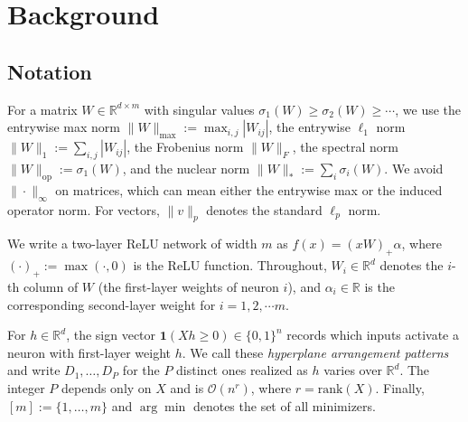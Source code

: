 \documentclass{article}
\begin{document}

\section{Background}
\label{sec:background} 

\subsection{Notation}
\label{sec:notation}
For a matrix $W \in \mathbb{R}^{d \times m}$ with singular values $\sigma_1(W) \geq \sigma_2(W) \geq \cdots$, we use the entrywise max norm $\|W\|_{\max} := \max_{i,j} |W_{ij}|$, the entrywise $\ell_1$ norm $\|W\|_1 := \sum_{i,j} |W_{ij}|$, the Frobenius norm $\|W\|_F$, the spectral norm $\|W\|_{\mathrm{op}} := \sigma_1(W)$, and the nuclear norm $\|W\|_* := \sum_i \sigma_i(W)$. We avoid $\|\cdot\|_\infty$ on matrices, which can mean either the entrywise max or the induced operator norm. For vectors, $\|v\|_p$ denotes the standard $\ell_p$ norm. 

We write a two-layer ReLU network of width $m$ as $f(x) = (xW)_+ \alpha$, where $(\cdot)_+ := \max(\cdot, 0)$ is the ReLU function. Throughout, $W_i \in \mathbb{R}^d$ denotes the $i$-th column of $W$ (the first-layer weights of neuron $i$), and $\alpha_i \in \mathbb{R}$ is the corresponding second-layer weight for $i = 1, 2, \cdots m$. 

For $h \in \mathbb{R}^d$, the sign vector $\mathbf{1}(Xh \geq 0) \in \{0,1\}^n$ records which inputs activate a neuron with first-layer weight $h$. We call these \emph{hyperplane arrangement patterns} and write $D_1, \ldots, D_P$ for the $P$ distinct ones realized as $h$ varies over $\mathbb{R}^d$. The integer $P$ depends only on $X$ and is $\mathcal{O}(n^r)$, where $r = \mathrm{rank}(X)$. Finally, $[m] := \{1, \ldots, m\}$ and $\arg\min$ denotes the set of all minimizers.
\end{document}
